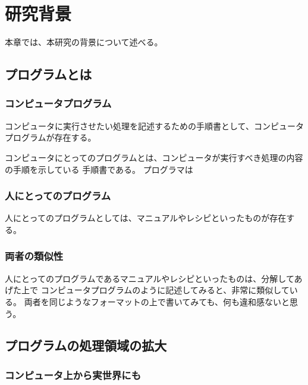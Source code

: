 \chapter{研究背景}\label{chap:background}

本章では、本研究の背景について述べる。

\section{プログラムとは}\label{ux30d7ux30edux30b0ux30e9ux30e0ux3068ux306f}

\subsection{コンピュータプログラム}\label{ux30b3ux30f3ux30d4ux30e5ux30fcux30bfux30d7ux30edux30b0ux30e9ux30e0}

コンピュータに実行させたい処理を記述するための手順書として、コンピュータプログラムが存在する。

コンピュータにとってのプログラムとは、コンピュータが実行すべき処理の内容の手順を示している
手順書である。 プログラマは

\subsection{人にとってのプログラム}\label{ux4ebaux306bux3068ux3063ux3066ux306eux30d7ux30edux30b0ux30e9ux30e0}

人にとってのプログラムとしては、マニュアルやレシピといったものが存在する。

\subsection{両者の類似性}\label{ux4e21ux8005ux306eux985eux4f3cux6027}

人にとってのプログラムであるマニュアルやレシピといったものは、分解してあげた上で
コンピュータプログラムのように記述してみると、非常に類似している。
両者を同じようなフォーマットの上で書いてみても、何も違和感ないと思う。

\section{プログラムの処理領域の拡大}\label{ux30d7ux30edux30b0ux30e9ux30e0ux306eux51e6ux7406ux9818ux57dfux306eux62e1ux5927}

\subsection{コンピュータ上から実世界にも}\label{ux30b3ux30f3ux30d4ux30e5ux30fcux30bfux4e0aux304bux3089ux5b9fux4e16ux754cux306bux3082}

